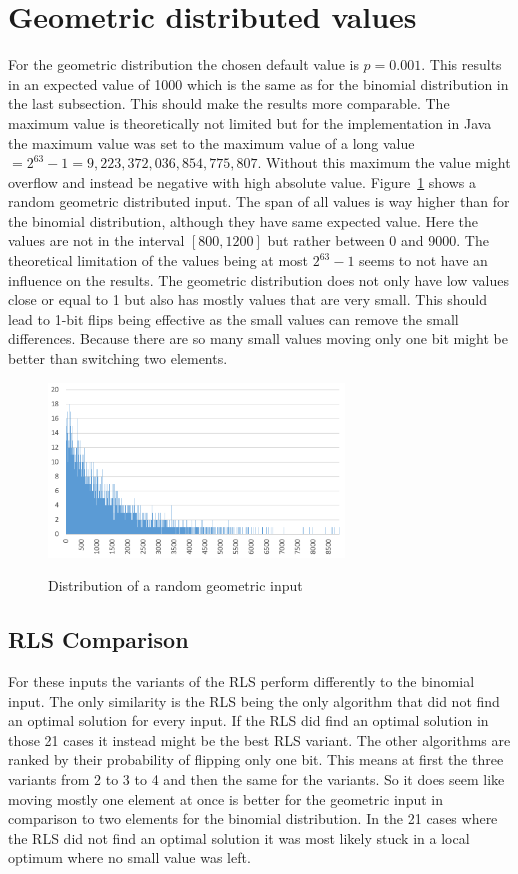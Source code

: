 \section{Geometric distributed values}
For the geometric distribution the chosen default value is $p=0.001$.
This results in an expected value of 1000 which is the same as for the binomial distribution in the last subsection.
This should make the results more comparable.
The maximum value is theoretically not limited but for the implementation in Java the maximum value was set to the maximum value of a long value $= 2^{63}-1 = 9,223,372,036,854,775,807$.
Without this maximum the value might overflow and instead be negative with high absolute value.
Figure~\ref{fig:geoDistExample} shows a random geometric distributed input.
The span of all values is way higher than for the binomial distribution, although they have same expected value.
Here the values are not in the interval $[800,1200]$ but rather between 0 and 9000.
The theoretical limitation of the values being at most $2^{63}-1$ seems to not have an influence on the results.
The geometric distribution does not only have low values close or equal to 1 but also has mostly values that are very small.
This should lead to 1-bit flips being effective as the small values can remove the small differences.
Because there are so many small values moving only one bit might be better than switching two elements.
\begin{figure}[h]
      \caption{Distribution of a random geometric input}
      \centering
      \includegraphics[width=0.7\textwidth]{figures/images/numberGenerator/geometricDistributionForp0_001.png}\label{fig:geoDistExample}
\end{figure}
\subsection{RLS Comparison}


For these inputs the variants of the RLS perform differently to the binomial input.
The only similarity is the RLS being the only algorithm that did not find an optimal solution for every input.
If the RLS did find an optimal solution in those 21 cases it instead might be the best RLS variant.
The other algorithms are ranked by their probability of flipping only one bit.
This means at first the three \RLSR[s] variants from 2 to 3 to 4 and then the same for the \RLSN[b] variants.
So it does seem like moving mostly one element at once is better for the geometric input in comparison to two elements for the binomial distribution.
In the 21 cases where the RLS did not find an optimal solution it was most likely stuck in a local optimum where no small value was left.

